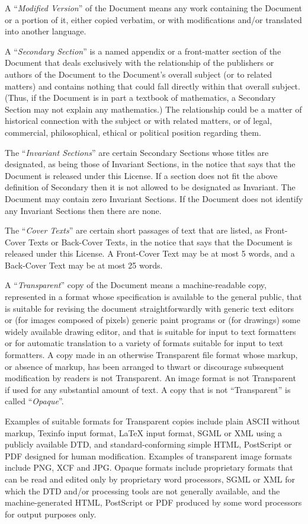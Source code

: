 \documentclass[a4paper,openany,10pt]{book}
\begin{document}
A ``\emph{Modified Version}'' of the Document means any work containing the
Document or a portion of it, either copied verbatim, or with
modifications and/or translated into another language.

A ``\emph{Secondary Section}'' is a named appendix or a front-matter section of
the Document that deals exclusively with the relationship of the
publishers or authors of the Document to the Document's overall subject
(or to related matters) and contains nothing that could fall directly
within that overall subject.  (Thus, if the Document is in part a
textbook of mathematics, a Secondary Section may not explain any
mathematics.)  The relationship could be a matter of historical
connection with the subject or with related matters, or of legal,
commercial, philosophical, ethical or political position regarding
them.

The ``\emph{Invariant Sections}'' are certain Secondary Sections whose titles
are designated, as being those of Invariant Sections, in the notice
that says that the Document is released under this License.  If a
section does not fit the above definition of Secondary then it is not
allowed to be designated as Invariant.  The Document may contain zero
Invariant Sections.  If the Document does not identify any Invariant
Sections then there are none.

The ``\emph{Cover Texts}'' are certain short passages of text that are listed,
as Front-Cover Texts or Back-Cover Texts, in the notice that says that
the Document is released under this License.  A Front-Cover Text may
be at most 5 words, and a Back-Cover Text may be at most 25 words.

A ``\emph{Transparent}'' copy of the Document means a machine-readable copy,
represented in a format whose specification is available to the
general public, that is suitable for revising the document
straightforwardly with generic text editors or (for images composed of
pixels) generic paint programs or (for drawings) some widely available
drawing editor, and that is suitable for input to text formatters or
for automatic translation to a variety of formats suitable for input
to text formatters.  A copy made in an otherwise Transparent file
format whose markup, or absence of markup, has been arranged to thwart
or discourage subsequent modification by readers is not Transparent.
An image format is not Transparent if used for any substantial amount
of text.  A copy that is not ``Transparent'' is called ``\emph{Opaque}''.

Examples of suitable formats for Transparent copies include plain
ASCII without markup, Texinfo input format, \LaTeX{} input format, SGML
or XML using a publicly available DTD, and standard-conforming simple
HTML, PostScript or PDF designed for human modification.  Examples of
transparent image formats include PNG, XCF and JPG.  Opaque formats
include proprietary formats that can be read and edited only by
proprietary word processors, SGML or XML for which the DTD and/or
processing tools are not generally available, and the
machine-generated HTML, PostScript or PDF produced by some word
processors for output purposes only.
\end{document}
